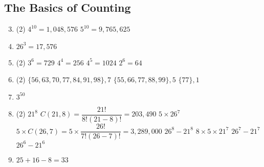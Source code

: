 \documentclass[12pt, A4]{article}
\begin{document}
		\subsection{The Basics of Counting}
			\begin{enumerate}
				\setcounter{enumi}{2}
				\item
					\begin{tasks}(2)
						\task
							\(4^10 = 1,048,576\)
						\task
							\(5^{10} = 9,765,625\)
					\end{tasks}
				\setcounter{enumi}{6}
				\item
					\(26^3 = 17,576\)	
				\setcounter{enumi}{18}
				\item
					\begin{tasks}(2)
						\task
							\(3^6 = 729\)
						\task
							\(4^4 = 256\)
						\task
							\(4^5 = 1024\)
						\task
							\(2^6 = 64\)
					\end{tasks}
				\setcounter{enumi}{20}
				\item
					\begin{tasks}(2)
						\task
							\(\{56, 63, 70, 77, 84, 91, 98\}, 7\)
						\task
							\(\{55, 66, 77, 88, 99\}, 5\)
						\task
							\(\{77\}, 1\)
					\end{tasks}
				\setcounter{enumi}{26}
				\item
					\(3^{50}\)
				\setcounter{enumi}{32}
				\item
					\begin{tasks}(2)
						\task
							\(21^8\)
						\task
							\(C(21, 8) = \dfrac{21!}{8!(21 - 8)!} = 203,490\)
						\task
							\(5 \times 26^7\)
						\task
							\(5 \times C(26, 7) = 5 \times \dfrac{26!}{7!(26 - 7)!} = 3,289,000\)
						\task
							\(26^8 - 21^8\)
						\task
							\(8 \times 5 \times 21^7\)
						\task
							\(26^7 - 21^7\)
						\task
							\(26^6 - 21^6\)
					\end{tasks}
				\setcounter{enumi}{54}
				\item
					\(25 + 16 - 8 = 33\)
			\end{enumerate}
		\setcounter{subsection}{2}
\end{document}
